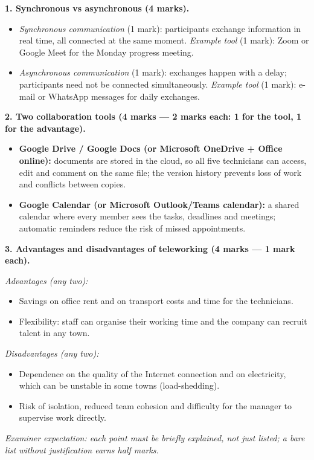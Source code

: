 \documentclass[11pt]{article}
\begin{document}
\begin{corrige}
\textbf{1. Synchronous vs asynchronous (4 marks).}
\begin{itemize}
\item \emph{Synchronous communication} (1 mark): participants exchange information in real time, all connected at the same moment. \emph{Example tool} (1 mark): Zoom or Google Meet for the Monday progress meeting.
\item \emph{Asynchronous communication} (1 mark): exchanges happen with a delay; participants need not be connected simultaneously. \emph{Example tool} (1 mark): e-mail or WhatsApp messages for daily exchanges.
\end{itemize}

\textbf{2. Two collaboration tools (4 marks — 2 marks each: 1 for the tool, 1 for the advantage).}
\begin{itemize}
\item \textbf{Google Drive / Google Docs (or Microsoft OneDrive + Office online):} documents are stored in the cloud, so all five technicians can access, edit and comment on the same file; the version history prevents loss of work and conflicts between copies.
\item \textbf{Google Calendar (or Microsoft Outlook/Teams calendar):} a shared calendar where every member sees the tasks, deadlines and meetings; automatic reminders reduce the risk of missed appointments.
\end{itemize}

\textbf{3. Advantages and disadvantages of teleworking (4 marks — 1 mark each).}

\emph{Advantages (any two):}
\begin{itemize}
\item Savings on office rent and on transport costs and time for the technicians.
\item Flexibility: staff can organise their working time and the company can recruit talent in any town.
\end{itemize}
\emph{Disadvantages (any two):}
\begin{itemize}
\item Dependence on the quality of the Internet connection and on electricity, which can be unstable in some towns (load-shedding).
\item Risk of isolation, reduced team cohesion and difficulty for the manager to supervise work directly.
\end{itemize}
\emph{Examiner expectation: each point must be briefly explained, not just listed; a bare list without justification earns half marks.}
\end{corrige}
\end{document}

